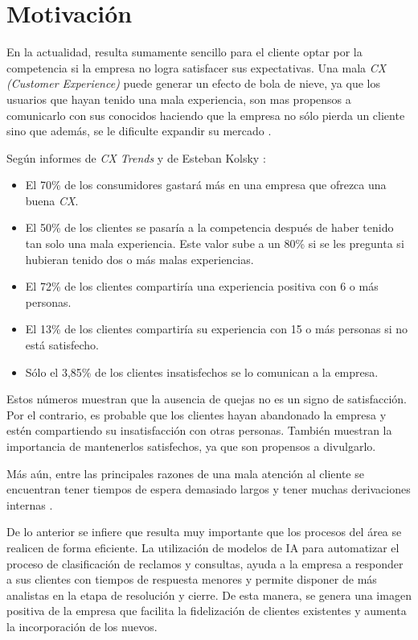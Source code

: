 
\section{Motivación}

En la actualidad, resulta sumamente sencillo para el cliente optar por la competencia si la empresa no logra satisfacer sus expectativas. Una mala \textit{CX (Customer Experience)} puede generar un efecto de bola de nieve, ya que los usuarios que hayan tenido una mala experiencia, son mas propensos a comunicarlo con sus conocidos haciendo que la empresa no sólo pierda un cliente sino que además, se le dificulte expandir su mercado \citep{WEBSITE:9}.

Según informes de \textit{CX Trends} \citep{cxtrends}\citep{WEBSITE:4}\citep{WEBSITE:10} y de Esteban Kolsky \citep{WEBSITE:11}:

\begin{itemize}
\item El 70\% de los consumidores gastará más en una empresa que ofrezca una buena \textit{CX}.
\item El 50\% de los clientes se pasaría a la competencia después de haber tenido tan solo una mala experiencia. Este valor sube a un 80\% si se les pregunta si hubieran tenido dos o más malas experiencias.
\item El 72\% de los clientes compartiría una experiencia positiva con 6 o más personas.
\item El 13\% de los clientes compartiría su experiencia con 15 o más personas si no está satisfecho.
\item Sólo el 3,85\% de los clientes insatisfechos se lo comunican a la empresa.
\end{itemize}

Estos números muestran que la ausencia de quejas no es un signo de satisfacción. Por el contrario, es probable que los clientes hayan abandonado la empresa y estén compartiendo su insatisfacción con otras personas. También muestran la importancia de mantenerlos satisfechos, ya que son propensos a divulgarlo.

Más aún, entre las principales razones de una mala atención al cliente se encuentran tener tiempos de espera demasiado largos \citep{WEBSITE:12} y tener muchas derivaciones internas \citep{WEBSITE:13}.

De lo anterior se infiere que resulta muy importante que los procesos del área se realicen de forma eficiente. La utilización de modelos de IA para automatizar el proceso de clasificación de reclamos y consultas, ayuda a la empresa a responder a sus clientes con tiempos de respuesta menores y permite disponer de más analistas en la etapa de resolución y cierre. De esta manera, se genera una imagen positiva de la empresa que facilita la fidelización de clientes existentes y aumenta la incorporación de los nuevos.

